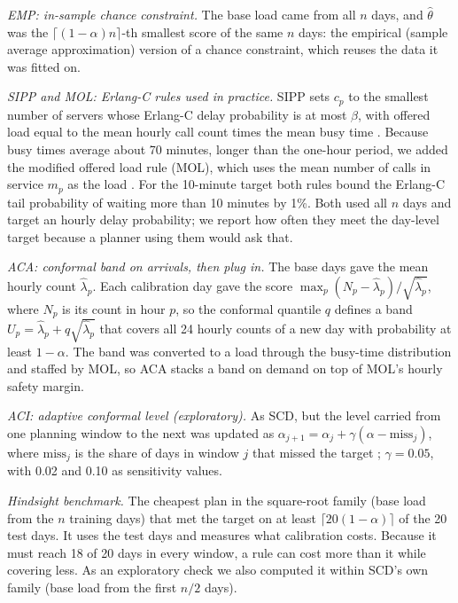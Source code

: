 \documentclass[11pt]{article}
\begin{document}
\emph{EMP: in-sample chance constraint.} The base load came from all $n$ days, and $\hat\theta$ was the $\lceil(1-\alpha)n\rceil$-th smallest score of the same $n$ days: the empirical (sample average approximation) version of a chance constraint, which reuses the data it was fitted on.

\emph{SIPP and MOL: Erlang-C rules used in practice.} SIPP sets $c_p$ to the smallest number of servers whose Erlang-C delay probability is at most $\beta$, with offered load equal to the mean hourly call count times the mean busy time \citep{green2001improving}. Because busy times average about 70 minutes, longer than the one-hour period, we added the modified offered load rule (MOL), which uses the mean number of calls in service $m_p$ as the load \citep{jennings1996server,feldman2008staffing}. For the 10-minute target both rules bound the Erlang-C tail probability of waiting more than 10 minutes by 1\%. Both used all $n$ days and target an hourly delay probability; we report how often they meet the day-level target because a planner using them would ask that.

\emph{ACA: conformal band on arrivals, then plug in.} The base days gave the mean hourly count $\hat\lambda_p$. Each calibration day gave the score $\max_p (N_p-\hat\lambda_p)/\sqrt{\hat\lambda_p}$, where $N_p$ is its count in hour $p$, so the conformal quantile $q$ defines a band $U_p=\hat\lambda_p+q\sqrt{\hat\lambda_p}$ that covers all 24 hourly counts of a new day with probability at least $1-\alpha$. The band was converted to a load through the busy-time distribution and staffed by MOL, so ACA stacks a band on demand on top of MOL's hourly safety margin.

\emph{ACI: adaptive conformal level (exploratory).} As SCD, but the level carried from one planning window to the next was updated as $\alpha_{j+1}=\alpha_j+\gamma(\alpha-\text{miss}_j)$, where $\text{miss}_j$ is the share of days in window $j$ that missed the target \citep{gibbs2021adaptive}; $\gamma=0.05$, with 0.02 and 0.10 as sensitivity values.

\emph{Hindsight benchmark.} The cheapest plan in the square-root family (base load from the $n$ training days) that met the target on at least $\lceil 20(1-\alpha)\rceil$ of the 20 test days. It uses the test days and measures what calibration costs. Because it must reach 18 of 20 days in every window, a rule can cost more than it while covering less. As an exploratory check we also computed it within SCD's own family (base load from the first $n/2$ days).
\end{document}
